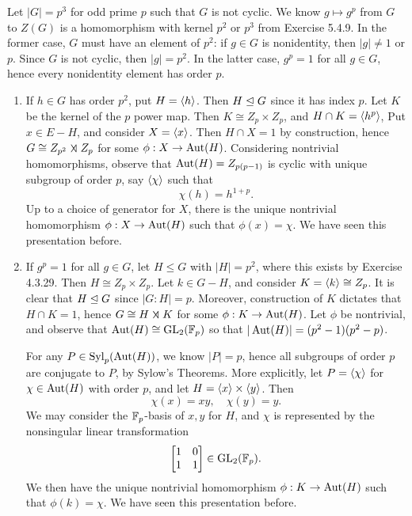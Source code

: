 \ex Let $|G| = p^3$ for odd prime $p$ such that $G$ is not cyclic. We know $g \mapsto g^p$ from $G$ to $Z(G)$ is a homomorphism with kernel $p^2$ or $p^3$ from Exercise 5.4.9. In the former case, $G$ must have an element of $p^2$: if $g \in G$ is nonidentity, then $|g| \neq 1$ or $p$. Since $G$ is not cyclic, then $|g| = p^2$. In the latter case, $g^p = 1$ for all $g \in G$, hence every nonidentity element has order $p$.
\begin{enumerate}
    \item If $h \in G$ has order $p^2$, put $H = \langle h\rangle$. Then $H \trianglelefteq G$ since it has index $p$. Let $K$ be the kernel of the $p$ power map. Then $K \cong Z_p \times Z_p$, and $H \cap K = \langle h^p\rangle$, Put $x \in E - H$, and consider $X = \langle x\rangle$. Then $H \cap X = 1$ by construction, hence $G \cong Z_{p^2} \semidir Z_p$ for some $\phi : X \to \operatorname{Aut}(H)$. Considering nontrivial homomorphisms, observe that $\operatorname{Aut}(H) = Z_{p(p - 1)}$ is cyclic with unique subgroup of order $p$, say $\langle\chi\rangle$ such that
    \[\chi(h) = h^{1 + p}.\]
    Up to a choice of generator for $X$, there is the unique nontrivial homomorphism $\phi : X \to \operatorname{Aut}(H)$ such that $\phi(x) = \chi$. We have seen this presentation before.
    \item If $g^p = 1$ for all $g \in G$, let $H \leq G$ with $|H| = p^2$, where this exists by Exercise 4.3.29. Then $H \cong Z_p \times Z_p$. Let $k \in G - H$, and consider $K = \langle k\rangle \cong Z_p$. It is clear that $H \trianglelefteq G$ since $|G : H| = p$. Moreover, construction of $K$ dictates that $H \cap K = 1$, hence $G \cong H \semidir K$ for some $\phi : K \to \operatorname{Aut}(H)$. Let $\phi$ be nontrivial, and observe that $\operatorname{Aut}(H) \cong \operatorname{GL}_2(\mathbb F_p)$ so that $|\operatorname{Aut}(H)| = (p^2 - 1)(p^2 - p)$.
    
    For any $P \in \operatorname{Syl}_p(\operatorname{Aut}(H))$, we know $|P| = p$, hence all subgroups of order $p$ are conjugate to $P$, by Sylow's Theorems. More explicitly, let $P = \langle\chi\rangle$ for $\chi \in \operatorname{Aut}(H)$ with order $p$, and let $H = \langle x\rangle \times \langle y\rangle$. Then
    \[\chi(x) = xy, \quad \chi(y) = y.\]
    We may consider the $\mathbb F_p$-basis of $x, y$ for $H$, and $\chi$ is represented by the nonsingular linear transformation
    \[\begin{bmatrix}
        1 & 0 \\
        1 & 1
    \end{bmatrix} \in \operatorname{GL}_2(\mathbb F_p).\]
    We then have the unique nontrivial homomorphism $\phi : K \to \operatorname{Aut}(H)$ such that $\phi(k) = \chi$. We have seen this presentation before.
\end{enumerate}